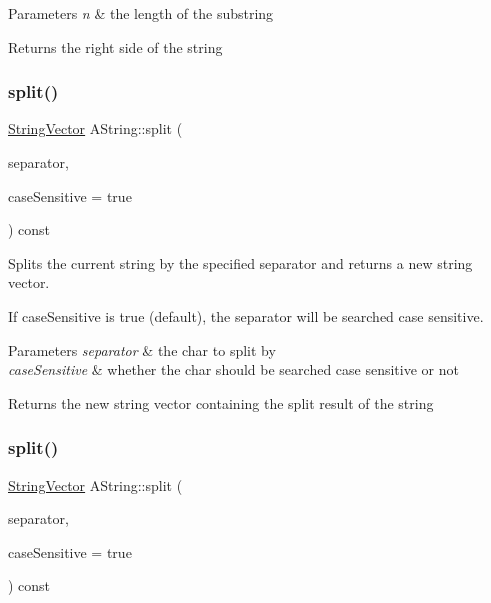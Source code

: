 \begin{DoxyParams}{Parameters}
{\em n} & the length of the substring \\
\hline
\end{DoxyParams}
\begin{DoxyReturn}{Returns}
the right side of the string 
\end{DoxyReturn}
\mbox{\label{class_a_string_a025f539406111e39b0bf54a2ffcda8aa}} 
\subsubsection{\texorpdfstring{split()}{split()}\hspace{0.1cm}{\footnotesize\ttfamily [1/2]}}
{\footnotesize\ttfamily \mbox{\hyperlink{class_string_vector}{String\+Vector}} A\+String\+::split (\begin{DoxyParamCaption}\item[{char}]{separator,  }\item[{bool}]{case\+Sensitive = {\ttfamily true} }\end{DoxyParamCaption}) const}



Splits the current string by the specified separator and returns a new string vector. 

If case\+Sensitive is true (default), the separator will be searched case sensitive.


\begin{DoxyParams}{Parameters}
{\em separator} & the char to split by \\
\hline
{\em case\+Sensitive} & whether the char should be searched case sensitive or not \\
\hline
\end{DoxyParams}
\begin{DoxyReturn}{Returns}
the new string vector containing the split result of the string 
\end{DoxyReturn}
\mbox{\label{class_a_string_a08266b27ed113b4a844b8eb9947b3e02}} 
\subsubsection{\texorpdfstring{split()}{split()}\hspace{0.1cm}{\footnotesize\ttfamily [2/2]}}
{\footnotesize\ttfamily \mbox{\hyperlink{class_string_vector}{String\+Vector}} A\+String\+::split (\begin{DoxyParamCaption}\item[{const \mbox{\hyperlink{class_a_string}{A\+String}} \&}]{separator,  }\item[{bool}]{case\+Sensitive = {\ttfamily true} }\end{DoxyParamCaption}) const}



